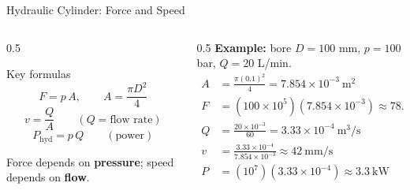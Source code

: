\documentclass[aspectratio=169]{beamer}
\begin{document}
	\begin{frame}{Hydraulic Cylinder: Force and Speed}
		\begin{columns}[T]
			\begin{column}{0.5\textwidth}
				\begin{block}{Key formulas}
					\small
					\[
					F = p\,A, \qquad A = \frac{\pi D^2}{4}
					\]
					\[
					v = \frac{Q}{A} \qquad (Q = \text{flow rate})
					\]
					\[
					P_{\text{hyd}} = p\,Q \qquad (\text{power})
					\]
				\end{block}
				\footnotesize Force depends on \textbf{pressure}; speed depends on \textbf{flow}.
			\end{column}
			\begin{column}{0.5\textwidth}
				\textbf{Example:} bore $D = 100$ mm, $p = 100$ bar, $Q = 20$ L/min.
				\small
				\begin{align*}
					A &= \tfrac{\pi (0.1)^2}{4} = 7.854\times10^{-3}\ \text{m}^2\\
					F &= (100\times10^{5})(7.854\times10^{-3}) \approx \boxed{78.5\ \text{kN}}\\
					Q &= \tfrac{20\times10^{-3}}{60} = 3.33\times10^{-4}\ \text{m}^3/\text{s}\\
					v &= \tfrac{3.33\times10^{-4}}{7.854\times10^{-3}} \approx \boxed{42\ \text{mm/s}}\\
					P &= (10^7)(3.33\times10^{-4}) \approx 3.3\ \text{kW}
				\end{align*}
			\end{column}
		\end{columns}
	\end{frame}

\end{document}
